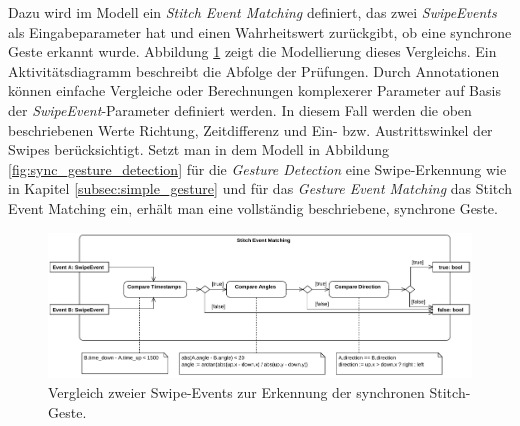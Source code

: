 Dazu wird im Modell ein \textit{Stitch Event Matching} definiert, das zwei \textit{SwipeEvents} als Eingabeparameter hat und einen Wahrheitswert zurückgibt, ob eine synchrone Geste erkannt wurde. Abbildung \ref{fig:stitch_event_matching} zeigt die Modellierung dieses Vergleichs. Ein Aktivitätsdiagramm beschreibt die Abfolge der Prüfungen. Durch Annotationen können einfache Vergleiche oder Berechnungen komplexerer Parameter auf Basis der \textit{SwipeEvent}-Parameter definiert werden. In diesem Fall werden die oben beschriebenen Werte Richtung, Zeitdifferenz und Ein- bzw. Austrittswinkel der Swipes berücksichtigt. Setzt man in dem Modell in Abbildung \ref{fig:sync_gesture_detection} für die \textit{Gesture  Detection} eine Swipe-Erkennung wie in Kapitel \ref{subsec:simple_gesture} und für das \textit{Gesture Event Matching} das Stitch Event Matching ein, erhält man eine vollständig beschriebene, synchrone Geste.
\begin{figure}[h]
\centering
\includegraphics[width=1\textwidth]{bilder/stitch_event_matching.pdf}
\caption{Vergleich zweier Swipe-Events zur Erkennung der synchronen Stitch-Geste.}
\label{fig:stitch_event_matching}
\end{figure}

